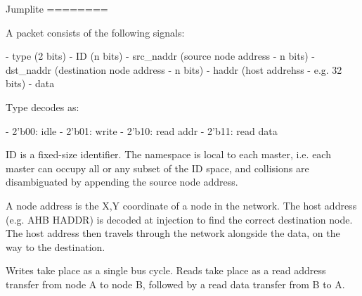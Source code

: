 Jumplite
========

A packet consists of the following signals:

- type (2 bits)
- ID (n bits)
- src_naddr (source node address - n bits)
- dst_naddr (destination node address - n bits)
- haddr (host addrehss - e.g. 32 bits)
- data

Type decodes as:

- 2'b00: idle
- 2'b01: write
- 2'b10: read addr
- 2'b11: read data

ID is a fixed-size identifier. The namespace is local to each master, i.e. each master can occupy all or any subset of the ID space, and collisions are disambiguated by appending the source node address.

A node address is the X,Y coordinate of a node in the network. The host address (e.g. AHB HADDR) is decoded at injection to find the correct destination node. The host address then travels through the network alongside the data, on the way to the destination.

Writes take place as a single bus cycle. Reads take place as a read address transfer from node A to node B, followed by a read data transfer from B to A.

